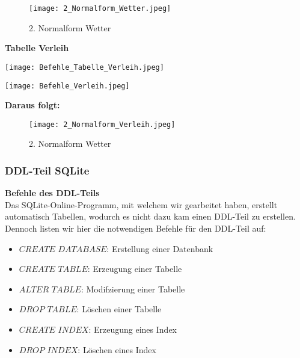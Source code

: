\documentclass[a4paper,12pt]{article}
\begin{document}
\begin{figure}[h]
    \centering
    \texttt{[image: 2\_Normalform\_Wetter.jpeg]}
    \caption{2. Normalform Wetter}
    \label{fig:enter-label}
\end{figure}


\newpage
\begin{center}
    \textbf{Tabelle Verleih}
\end{center}

   \begin{minipage}{0.45\textwidth}
        \centering
        \texttt{[image: Befehle\_Tabelle\_Verleih.jpeg]}
    \end{minipage} \hspace{0.5cm}
    \begin{minipage}{0.45\textwidth}
        \centering
        \texttt{[image: Befehle\_Verleih.jpeg]}
    \end{minipage}

\begin{center}
    

\textbf{Daraus folgt:}

\end{center}


\begin{figure}[H]
    \centering
    \texttt{[image: 2\_Normalform\_Verleih.jpeg]}
    \caption{2. Normalform Wetter}
    \label{fig:enter-label}
\end{figure}
\vspace{2cm}
\subsubsection{DDL-Teil SQLite}
\textbf{Befehle des DDL-Teils}\\Das SQLite-Online-Programm, mit welchem wir gearbeitet haben, erstellt automatisch Tabellen, wodurch es nicht dazu kam einen DDL-Teil zu erstellen. Dennoch listen wir hier die notwendigen Befehle für den DDL-Teil auf: 

\begin{itemize}
    \item $CREATE$ $DATABASE$: Erstellung einer Datenbank
    \item $CREATE$ $TABLE$: Erzeugung einer Tabelle
    \item $ALTER$ $TABLE$: Modifzierung einer Tabelle
    \item $DROP$ $TABLE$: Löschen einer Tabelle
    \item $CREATE$ $INDEX$: Erzeugung eines Index
    \item $DROP$ $INDEX$: Löschen eines Index
\end{itemize}
\newpage
\end{document}
